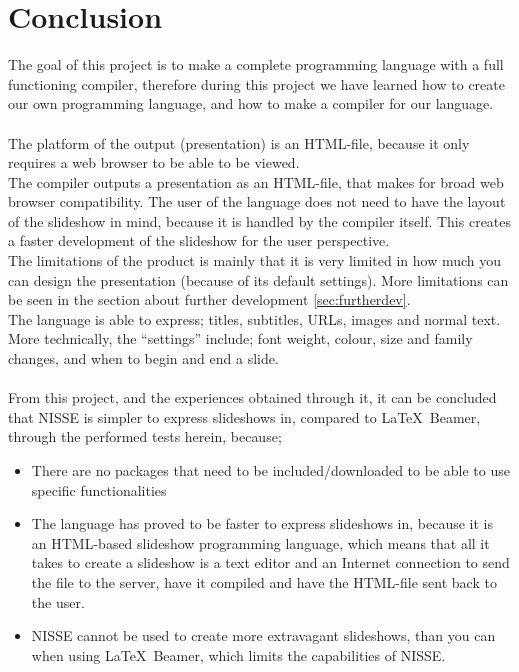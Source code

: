 \chapter{Conclusion}

The goal of this project is to make a complete programming language with a full functioning compiler, therefore during this project we have learned how to create our own programming language, and how to make a compiler for our language. \\

 \\
The platform of the output (presentation) is an HTML-file, because it only requires a web browser to be able to be viewed. \\
The compiler outputs a presentation as an HTML-file, that makes for broad web browser compatibility. The user of the language does not need to have the layout of the slideshow in mind, because it is handled by the compiler itself. This creates a faster development of the slideshow for the user perspective. \\
The limitations of the product is mainly that it is very limited in how much you can design the presentation (because of its default settings). More limitations can be seen in the section about further development \ref{sec:furtherdev}. \\
The language is able to express; titles, subtitles, URLs, images and normal text. \\
More technically, the ``settings'' include; font weight, colour, size and family changes, and when to begin and end a slide.
\\ \\
From this project, and the experiences obtained through it, it can be concluded that NISSE is simpler to express slideshows in, compared to \LaTeX~Beamer, through the performed tests herein, because;
\begin{itemize}
	\item There are no packages that need to be included/downloaded to be able to use specific functionalities
	\item The language has proved to be faster to express slideshows in, because it is an HTML-based slideshow programming language, which means that all it takes to create a slideshow is a text editor and an Internet connection to send the file to the server, have it compiled and have the HTML-file sent back to the user. 
\item NISSE cannot be used to create more extravagant slideshows, than you can when using \LaTeX~Beamer, which limits the capabilities of NISSE.
\end{itemize}